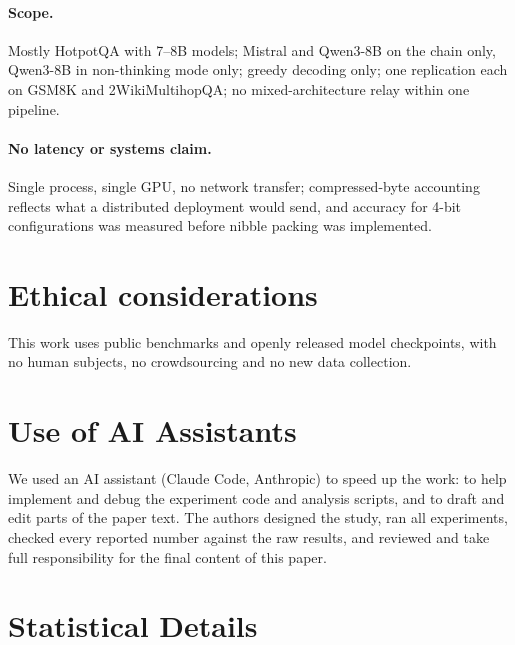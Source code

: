 \documentclass[11pt]{article}
\begin{document}
\paragraph{Scope.} Mostly HotpotQA with 7--8B models; Mistral and
Qwen3-8B on the chain only, Qwen3-8B in non-thinking mode only; greedy
decoding only; one replication each on GSM8K and 2WikiMultihopQA; no
mixed-architecture relay within one pipeline.

\paragraph{No latency or systems claim.} Single process, single GPU, no
network transfer; compressed-byte accounting reflects what a distributed
deployment would send, and accuracy for 4-bit configurations was measured
before nibble packing was implemented.


\section*{Ethical considerations}

This work uses public benchmarks and openly
released model checkpoints, with no human subjects, no crowdsourcing and no new
data collection.

\section*{Use of AI Assistants}

We used an AI assistant (Claude Code, Anthropic) to speed up the work: to help
implement and debug the experiment code and analysis scripts, and to draft and edit
parts of the paper text. The authors designed the study, ran all experiments,
checked every reported number against the raw results, and reviewed and take full
responsibility for the final content of this paper.





\appendix

\section{Statistical Details}
\label{app:stats}
\end{document}
